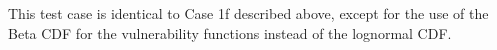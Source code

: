 This test case is identical to Case 1f described above, except for the use of the Beta CDF for the vulnerability functions instead of the lognormal CDF.